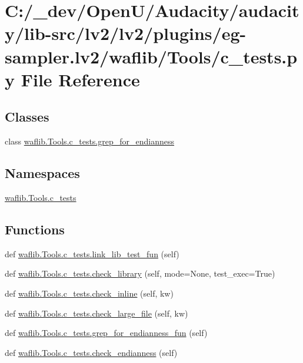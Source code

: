 \hypertarget{lv2_2plugins_2eg-sampler_8lv2_2waflib_2_tools_2c__tests_8py}{}\section{C\+:/\+\_\+dev/\+Open\+U/\+Audacity/audacity/lib-\/src/lv2/lv2/plugins/eg-\/sampler.lv2/waflib/\+Tools/c\+\_\+tests.py File Reference}
\label{lv2_2plugins_2eg-sampler_8lv2_2waflib_2_tools_2c__tests_8py}
\subsection*{Classes}
\begin{DoxyCompactItemize}
\item 
class \hyperlink{classwaflib_1_1_tools_1_1c__tests_1_1grep__for__endianness}{waflib.\+Tools.\+c\+\_\+tests.\+grep\+\_\+for\+\_\+endianness}
\end{DoxyCompactItemize}
\subsection*{Namespaces}
\begin{DoxyCompactItemize}
\item 
 \hyperlink{namespacewaflib_1_1_tools_1_1c__tests}{waflib.\+Tools.\+c\+\_\+tests}
\end{DoxyCompactItemize}
\subsection*{Functions}
\begin{DoxyCompactItemize}
\item 
def \hyperlink{namespacewaflib_1_1_tools_1_1c__tests_a58fcfbe9b3ba09e1a057dc1276435776}{waflib.\+Tools.\+c\+\_\+tests.\+link\+\_\+lib\+\_\+test\+\_\+fun} (self)
\item 
def \hyperlink{namespacewaflib_1_1_tools_1_1c__tests_a6769fa909685b6d42bde7746f3e59a64}{waflib.\+Tools.\+c\+\_\+tests.\+check\+\_\+library} (self, mode=None, test\+\_\+exec=True)
\item 
def \hyperlink{namespacewaflib_1_1_tools_1_1c__tests_a8c36c48a71d56e13d6a7973972ef7fb8}{waflib.\+Tools.\+c\+\_\+tests.\+check\+\_\+inline} (self, kw)
\item 
def \hyperlink{namespacewaflib_1_1_tools_1_1c__tests_ac29778f60925677c62b37a4da6a94322}{waflib.\+Tools.\+c\+\_\+tests.\+check\+\_\+large\+\_\+file} (self, kw)
\item 
def \hyperlink{namespacewaflib_1_1_tools_1_1c__tests_a94db04af071d40c6a2b181ae0925389c}{waflib.\+Tools.\+c\+\_\+tests.\+grep\+\_\+for\+\_\+endianness\+\_\+fun} (self)
\item 
def \hyperlink{namespacewaflib_1_1_tools_1_1c__tests_a83231aa06753183ca283a2d9b4cf39ce}{waflib.\+Tools.\+c\+\_\+tests.\+check\+\_\+endianness} (self)
\end{DoxyCompactItemize}
